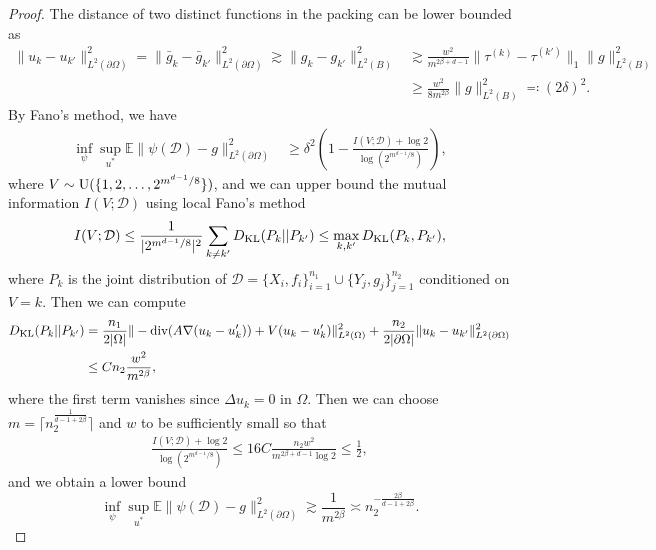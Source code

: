 \documentclass{article}
\newcommand{\E}{\mathbb{E}}
\newcommand{\KL}{\textnormal{KL}}
\newcommand{\D}{\mathcal{D}}
\renewcommand{\div}{\textnormal{div}}
\theoremstyle{plain}
\theoremstyle{definition}
\theoremstyle{remark}
\begin{document}
\begin{proof}
The distance of two distinct functions in the packing can be lower bounded as
\begin{align*}
    \|u_k - u_{k'}\|_{L^2(\partial \Omega)}^2 = \|\bar{g}_k - \bar{g}_{k'}\|_{L^2(\partial \Omega)}^2 \gtrsim \|g_k - g_{k'}\|_{L^2(B)}^2 & \gtrsim \frac{w^2}{m^{2\beta+d-1}} \|\tau^{(k)} - \tau^{(k')}\|_1 \|g\|_{L^2(B)}^2 \\ & \geq \frac{w^2}{8 m^{2\beta}} \|g\|_{L^2(B)}^2 \eqqcolon (2\delta)^2. 
\end{align*}
By Fano's method, we have
    \begin{align*}
        \inf_\psi \sup_{u^*} \E
    \|\psi(\D) - g\|_{L^2(\partial \Omega)}^2  & \geq \delta^2 \left(1 - \frac{I(V; \D) + \log{2}}{\log(2^{m^{d-1}/8})}\right),
    \end{align*}
    where $V \sim \textnormal{U}(\{1, 2, \ldots, 2^{m^{d-1}/8}\})$, and we can upper bound the mutual information $I(V;\D)$ using local Fano's method 
    \begin{equation*}
        I(V; \D) \leq \frac{1}{|2^{m^{d-1}/8}|^2} \sum_{k \neq k'} D_{\KL}(P_k || P_{k'}) \leq \max_{k, k'} D_{\KL} (P_k, P_{k'}),
    \end{equation*}
     where $P_k$ is the joint distribution of $\D = \{X_i, f_i\}_{i=1}^{n_1} \cup \{Y_j, g_j\}_{j=1}^{n_2}$ conditioned on $V = k$. Then we can compute
    \begin{align*}
        D_{\KL} (P_k || P_{k'}) & = \frac{n_1}{2 |\Omega|} \|-\div (A \nabla (u_k -u_k')) + V(u_k - u_k') \|_{L^2(\Omega)}^2  + \frac{n_2}{2 |\partial \Omega|} \|u_k - u_{k'}\|_{L^2(\partial \Omega)}^2 \\
        & \leq C n_2 \frac{w^2}{m^{2\beta}},
    \end{align*}
    where the first term vanishes since $\Delta u_k = 0$ in $\Omega$. Then we can choose $m = \lceil n_2^{\frac{1}{d -1 + 2\beta}} \rceil$ and $w$ to be sufficiently small so that
    \begin{align*}
        \frac{I(V; \D) + \log{2}}{\log(2^{m^{d-1}/8})} \leq 16 C\frac{n_2 w^2}{m^{2\beta + d-1} \log{2}}\leq \frac{1}{2}, 
    \end{align*}
    and we obtain a lower bound
    \begin{equation*}
        \inf_\psi \sup_{u^*} \E
    \|\psi(\D) - g\|_{L^2(\partial \Omega)}^2 \gtrsim \frac{1}{m^{2\beta}} \asymp n_2^{-\frac{2\beta}{d-1+2\beta}}. 
    \end{equation*}
\end{proof}
\end{document}
